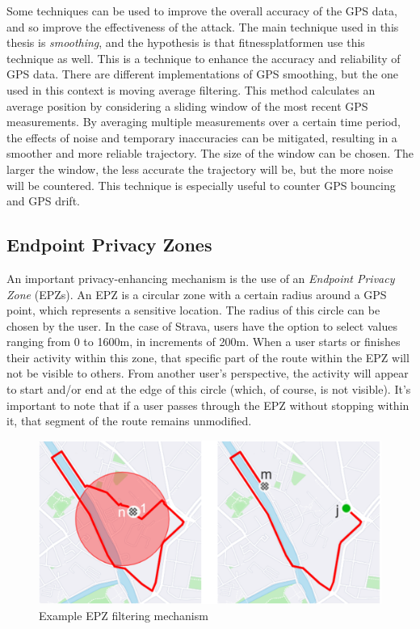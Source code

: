 \documentclass[conference]{IEEEtran}
\begin{document}
Some techniques can be used to improve the overall accuracy of the GPS data,
and so improve the effectiveness of the attack. The main technique used in this
thesis is \textit{smoothing}, and the hypothesis is that fitnessplatformen use
this technique as well. This is a technique to enhance the accuracy and
reliability of GPS data. There are different implementations of GPS smoothing,
but the one used in this context is moving average filtering. This method
calculates an average position by considering a sliding window of the most
recent GPS measurements. By averaging multiple measurements over a certain time
period, the effects of noise and temporary inaccuracies can be mitigated,
resulting in a smoother and more reliable trajectory. The size of the window
can be chosen. The larger the window, the less accurate the trajectory will be,
but the more noise will be countered. This technique is especially useful to
counter GPS bouncing and GPS drift.

\subsection{Endpoint Privacy Zones}
An important privacy-enhancing mechanism is the use of an \textit{Endpoint
    Privacy Zone} (EPZs). An EPZ is a circular zone with a certain radius around a
GPS point, which represents a sensitive location. The radius of this circle can
be chosen by the user. In the case of Strava, users have the option to select
values ranging from 0 to 1600m, in increments of 200m. When a user starts or
finishes their activity within this zone, that specific part of the route
within the EPZ will not be visible to others. From another user's perspective,
the activity will appear to start and/or end at the edge of this circle (which,
of course, is not visible). It's important to note that if a user passes
through the EPZ without stopping within it, that segment of the route remains
unmodified.
\begin{figure}[h]
    \centering
    \includegraphics[width=\linewidth]{fig/EPZ-mechanisme/DropEPZPoints.png}
    \caption{Example EPZ filtering mechanism~\cite{Dhondt}}\label{fig:epzmechanisme}
\end{figure}
\end{document}
